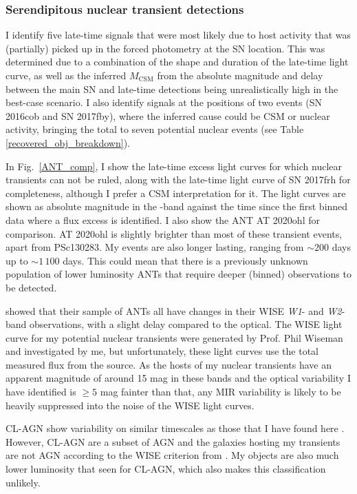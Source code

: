 \documentclass[a4paper,oneside,12pt, class=Latex/Classes/PhDthesisPSnPDF, crop=false]{standalone}
\begin{document}
\subsubsection{Serendipitous nuclear transient detections}
\label{sec:discussion:nuclear}
I identify five late-time signals that were most likely due to host activity that was (partially) picked up in the forced photometry at the SN location. This was determined due to a combination of the shape and duration of the late-time light curve, as well as the inferred $M_\text{CSM}$ from the absolute magnitude and delay between the main SN and late-time detections being unrealistically high in the best-case scenario. I also identify signals at the positions of two events (SN 2016cob and SN 2017fby), where the inferred cause could be CSM or nuclear activity, bringing the total to seven potential nuclear events (see Table \ref{recovered_obj_breakdown}).

In Fig.~\ref{ANT_comp}, I show the late-time excess light curves for which nuclear transients can not be ruled, along with the late-time light curve of SN 2017frh for completeness, although I prefer a CSM interpretation for it. The light curves are shown as absolute magnitude in the \ztfr-band against the time since the first binned data where a flux excess is identified. I also show the ANT AT 2020ohl \citep{2020ohl_Hinkle} for comparison. AT 2020ohl is slightly brighter than most of these transient events, apart from PSc130283. My events are also longer lasting, ranging from $\sim200$ days up to $\sim1\,100$ days. This could mean that there is a previously unknown population of lower luminosity ANTs that require deeper (binned) observations to be detected.

\citet{wiseman_ztfants} showed that their sample of ANTs all have changes in their WISE \textit{W1}- and \textit{W2}-band observations, with a slight delay compared to the optical. The WISE light curve for my potential nuclear transients were generated by Prof. Phil Wiseman and investigated by me, but unfortunately, these light curves use the total measured flux from the source. As the hosts of my nuclear transients have an apparent magnitude of around 15 mag in these bands and the optical variability I have identified is $\geq5$ mag fainter than that, any MIR variability is likely to be heavily suppressed into the noise of the WISE light curves.

CL-AGN show variability on similar timescales as those that I have found here \citep{CLAGN}. However, CL-AGN are a subset of AGN and the galaxies hosting my transients are not AGN according to the WISE criterion from \citet{WISE_crit}. My objects are also much lower luminosity that seen for CL-AGN, which also makes this classification unlikely.
\end{document}
